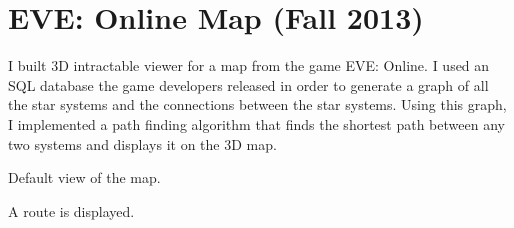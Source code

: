 
\section{EVE: Online Map (Fall 2013)}

I built 3D intractable viewer for a map from the game EVE: Online.
I used an SQL database the game developers released in order to generate
a graph of all the star systems and the connections between the star systems.
Using this graph, I implemented a path finding algorithm that finds the
shortest path between any two systems and displays it on the 3D map.

\centerline{Default view of the map.}

\centerline{A route is displayed.}